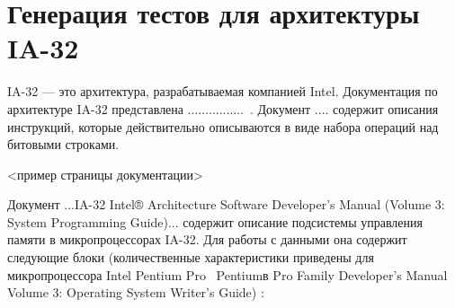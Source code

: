 \documentclass[14pt]{extreport}
\begin{document}
\section{Генерация тестов для архитектуры IA-32}

IA-32 --- это архитектура, разрабатываемая компанией Intel. Документация по
архитектуре IA-32 представлена ................~\cite{??????????}. Документ
.... содержит описания инструкций, которые действительно описываются в виде
набора
операций над битовыми строками.

<пример страницы документации>

Документ ...IA-32 Intel® Architecture Software Developer's Manual (Volume 3:
System Programming Guide)... содержит описание подсистемы управления памяти в
микропроцессорах IA-32. Для работы с данными она содержит следующие блоки
(количественные характеристики приведены для микропроцессора Intel Pentium
Pro~\cite{????????} Pentiumв Pro Family
Developer’s Manual Volume 3: Operating System Writer’s Guide) :
\end{document}
